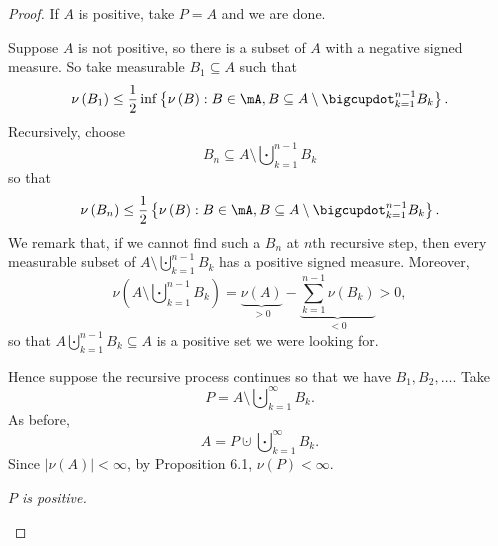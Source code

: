 \documentclass[pmath451]{subfiles}
\begin{document}
    \begin{proof}
        If $A$ is positive, take $P=A$ and we are done.

        Suppose $A$ is not positive, so there is a subset of $A$ with a negative signed measure. So take measurable $B_1\subseteq A$ such that
        \begin{equation*}
            \nu\left( B_1 \right) \leq \frac{1}{2}\inf\left\lbrace \nu\left( B \right):B\in\mA, B\subseteq A\setminus\bigcupdot^{n-1}_{k=1}B_k \right\rbrace.
        \end{equation*}
        Recursively, choose
        \begin{equation*}
            B_n \subseteq A\setminus \bigcupdot^{n-1}_{k=1} B_k
        \end{equation*}
        so that
        \begin{equation*}
            \nu\left( B_n \right)\leq \frac{1}{2}\left\lbrace \nu\left( B \right):B\in\mA,B\subseteq A\setminus\bigcupdot^{n-1}_{k=1}B_k \right\rbrace.
        \end{equation*}
        We remark that, if we cannot find such a $B_n$ at $n$th recursive step, then every measurable subset of $A\setminus\bigcupdot^{n-1}_{k=1}B_k$ has a positive signed measure. Moreover,
        \begin{equation*}
            \nu\left( A\setminus\bigcupdot^{n-1}_{k=1}B_k \right) = \underbrace{\nu\left( A \right)}_{>0} - \underbrace{\sum^{n-1}_{k=1} \nu\left( B_k \right)}_{<0} > 0,
        \end{equation*}
        so that $A\bigcupdot^{n-1}_{k=1}B_k \subseteq A$ is a positive set we were looking for.

        Hence suppose the recursive process continues so that we have $B_1,B_2,\ldots$. Take
        \begin{equation*}
            P = A\setminus\bigcupdot^{\infty}_{k=1} B_k.
        \end{equation*}
        As before,
        \begin{equation*}
            A = P\cupdot\bigcupdot^{\infty}_{k=1} B_k.
        \end{equation*}
        Since $\left| \nu\left( A \right) \right|<\infty$, by Proposition 6.1, $\nu\left( P \right) < \infty$.

        \begin{claim}
            \textit{$P$ is positive.}


\end{claim}
\end{proof}
\end{document}
